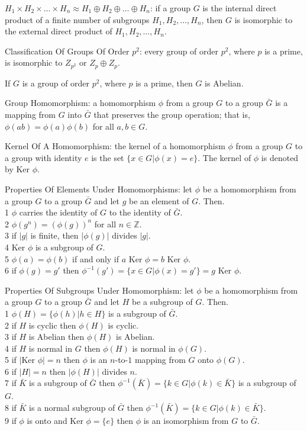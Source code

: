 $H_1 \times H_2 \times \dots \times H_n \approx H_1 \oplus H_2 \oplus \dots \oplus H_n$: if a group $G$ is the internal direct product of a finite number of subgroups $H_1,H_2,\dots,H_n$, then $G$ is isomorphic to the external direct product of $H_1,H_2,\dots,H_n$.

Classification Of Groups Of Order $p^2$: every group of order $p^2$, where $p$ is a prime, is isomorphic to $Z_{p^2}$ or $Z_p \oplus Z_p$.

If $G$ is a group of order $p^2$, where $p$ is a prime, then $G$ is Abelian.

Group Homomorphism: a homomorphism $\phi$ from a group $G$ to a group $\bar{G}$ is a mapping from $G$ into $\bar{G}$ that preserves the group operation; that is, $\phi (ab) = \phi (a) \phi (b)$ for all $a,b \in G$.

Kernel Of A Homomorphism: the kernel of a homomorphism $\phi$ from a group $G$ to a group with identity $e$ is the set $\{ x \in G | \phi (x)=e \}$. The kernel of $\phi$ is denoted by $\text{Ker } \phi$.

Properties Of Elements Under Homomorphisms: let $\phi$ be a homomorphism from a group $G$ to a group $\bar{G}$ and let $g$ be an element of $G$. Then. \\
1 $\phi$ carries the identity of $G$ to the identity of $\bar{G}$. \\
2 $\phi (g^n) = (\phi (g))^n$ for all $n \in \mathbb{Z}$. \\
3 if $|g|$ is finite, then $|\phi (g)|$ divides $|g|$. \\
4 $\text{Ker } \phi$ is a subgroup of $G$. \\
5 $\phi (a)=\phi (b)$ if and only if $a\text{ Ker }\phi = b\text{ Ker }\phi$. \\
6 if $\phi (g)=g'$ then $\phi^{-1} (g') = \{ x \in G | \phi (x)=g' \} = g \text{ Ker }\phi$.

Properties Of Subgroups Under Homomorphism: let $\phi$ be a homomorphism from a group $G$ to a group $\bar{G}$ and let $H$ be a subgroup of $G$. Then. \\
1 $\phi (H) = \{\phi (h) | h \in H \}$ is a subgroup of $\bar{G}$. \\
2 if $H$ is cyclic then $\phi (H)$ is cyclic. \\
3 if $H$ is Abelian then $\phi (H)$ is Abelian. \\
4 if $H$ is normal in $G$ then $\phi (H)$ is normal in $\phi (G)$. \\
5 if $|\text{Ker }\phi|=n$ then $\phi$ is an $n$-to-$1$ mapping from $G$ onto $\phi (G)$. \\
6 if $|H|=n$ then $|\phi (H)|$ divides $n$. \\
7 if $\bar{K}$ is a subgroup of $\bar{G}$ then $\phi^{-1} (\bar{K}) = \{k \in G | \phi (k) \in \bar{K} \}$ is a subgroup of $G$. \\
8 if $\bar{K}$ is a normal subgroup of $\bar{G}$ then $\phi^{-1} (\bar{K}) = \{k \in G | \phi (k) \in \bar{K} \}$. \\
9 if $\phi$ is onto and $\text{Ker }\phi = \{ e \}$ then $\phi$ is an isomorphism from $G$ to $\bar{G}$.


